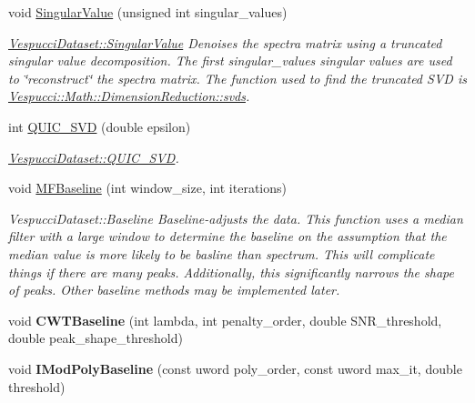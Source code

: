 \begin{DoxyCompactItemize}
void \hyperlink{class_vespucci_dataset_ada0febff69cc36c4af9c8f46220450a0}{Singular\+Value} (unsigned int singular\+\_\+values)
\begin{DoxyCompactList}\small\item\em \hyperlink{class_vespucci_dataset_ada0febff69cc36c4af9c8f46220450a0}{Vespucci\+Dataset\+::\+Singular\+Value} Denoises the spectra matrix using a truncated singular value decomposition. The first singular\+\_\+values singular values are used to \char`\"{}reconstruct\char`\"{} the spectra matrix. The function used to find the truncated S\+VD is \hyperlink{namespace_vespucci_1_1_math_1_1_dimension_reduction_aebb6fc52c28c84d321c63de22b1f5f9f}{Vespucci\+::\+Math\+::\+Dimension\+Reduction\+::svds}. \end{DoxyCompactList}\item 
int \hyperlink{class_vespucci_dataset_a6489d547c05a8e36b392d0d6147674c8}{Q\+U\+I\+C\+\_\+\+S\+VD} (double epsilon)
\begin{DoxyCompactList}\small\item\em \hyperlink{class_vespucci_dataset_a6489d547c05a8e36b392d0d6147674c8}{Vespucci\+Dataset\+::\+Q\+U\+I\+C\+\_\+\+S\+VD}. \end{DoxyCompactList}\item 
void \hyperlink{class_vespucci_dataset_ae93155d27c471a8b70ecca56a6e51911}{M\+F\+Baseline} (int window\+\_\+size, int iterations)
\begin{DoxyCompactList}\small\item\em Vespucci\+Dataset\+::\+Baseline Baseline-\/adjusts the data. This function uses a median filter with a large window to determine the baseline on the assumption that the median value is more likely to be basline than spectrum. This will complicate things if there are many peaks. Additionally, this significantly narrows the shape of peaks. Other baseline methods may be implemented later. \end{DoxyCompactList}\item 
void {\bfseries C\+W\+T\+Baseline} (int lambda, int penalty\+\_\+order, double S\+N\+R\+\_\+threshold, double peak\+\_\+shape\+\_\+threshold)\hypertarget{class_vespucci_dataset_a1e6139e650351a6664e6dd0f15d62f07}{}\label{class_vespucci_dataset_a1e6139e650351a6664e6dd0f15d62f07}

\item 
void {\bfseries I\+Mod\+Poly\+Baseline} (const uword poly\+\_\+order, const uword max\+\_\+it, double threshold)\hypertarget{class_vespucci_dataset_a6eef6ffb28ecf5b0475a06e4f23e31fd}{}\label{class_vespucci_dataset_a6eef6ffb28ecf5b0475a06e4f23e31fd}


\end{DoxyCompactItemize}
